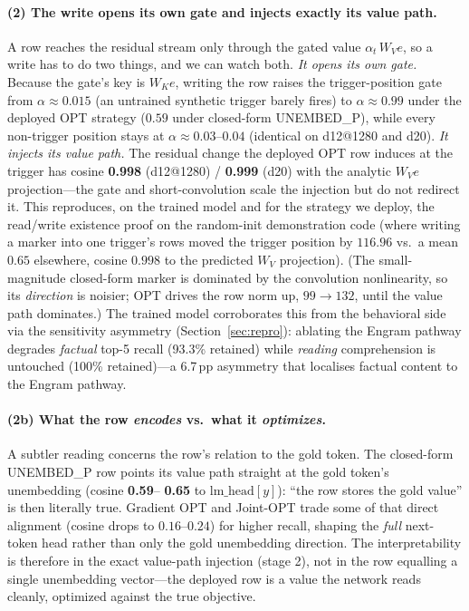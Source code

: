 \documentclass[11pt]{article}
\begin{document}
\paragraph{(2) The write opens its own gate and injects exactly its
value path.} A row reaches the residual stream only through the
gated value $\alpha_t\,W_V e$, so a write has to do two things, and we
can watch both. \emph{It opens its own gate.} Because the gate's key
is $W_K e$, writing the row raises the trigger-position gate from
$\alpha\!\approx\!0.015$ (an untrained synthetic trigger barely
fires) to $\alpha\!\approx\!0.99$ under the deployed OPT strategy
($0.59$ under closed-form UNEMBED\_P), while every non-trigger
position stays at $\alpha\!\approx\!0.03$--$0.04$ (identical on
d12@1280 and d20). \emph{It injects its value path.} The residual
change the deployed OPT row induces at the trigger has cosine
\textbf{0.998} (d12@1280) / \textbf{0.999} (d20) with the analytic
$W_V e$ projection---the gate and short-convolution scale the
injection but do not redirect it. This reproduces, on the trained
model and for the strategy we deploy, the read/write existence proof
on the random-init demonstration code (where writing a marker into
one trigger's rows moved the trigger position by $116.96$ vs.\ a mean
$0.65$ elsewhere, cosine $0.998$ to the predicted $W_V$ projection). (The small-magnitude
closed-form marker is dominated by the convolution nonlinearity, so
its \emph{direction} is noisier; OPT drives the row norm up, $99\to
132$, until the value path dominates.) The trained model corroborates
this from the behavioral side via the sensitivity asymmetry
(Section~\ref{sec:repro}): ablating the Engram pathway degrades \emph{factual} top-5 recall
(93.3\% retained) while \emph{reading} comprehension is untouched
(100\% retained)---a 6.7\,pp asymmetry that localises factual content
to the Engram pathway.

\paragraph{(2b) What the row \emph{encodes} vs.\ what it
\emph{optimizes}.} A subtler reading concerns the row's relation to
the gold token. The closed-form UNEMBED\_P row points its value path
straight at the gold token's unembedding (cosine \textbf{0.59}--%
\textbf{0.65} to $\text{lm\_head}[y]$): ``the row stores the gold
value'' is then literally true. Gradient OPT and Joint-OPT trade some
of that direct alignment (cosine drops to $0.16$--$0.24$) for higher
recall, shaping the \emph{full} next-token head rather than only the
gold unembedding direction. The interpretability is therefore in the
exact value-path injection (stage 2), not in the row equalling a
single unembedding vector---the deployed row is a value the network
reads cleanly, optimized against the true objective.
\end{document}
